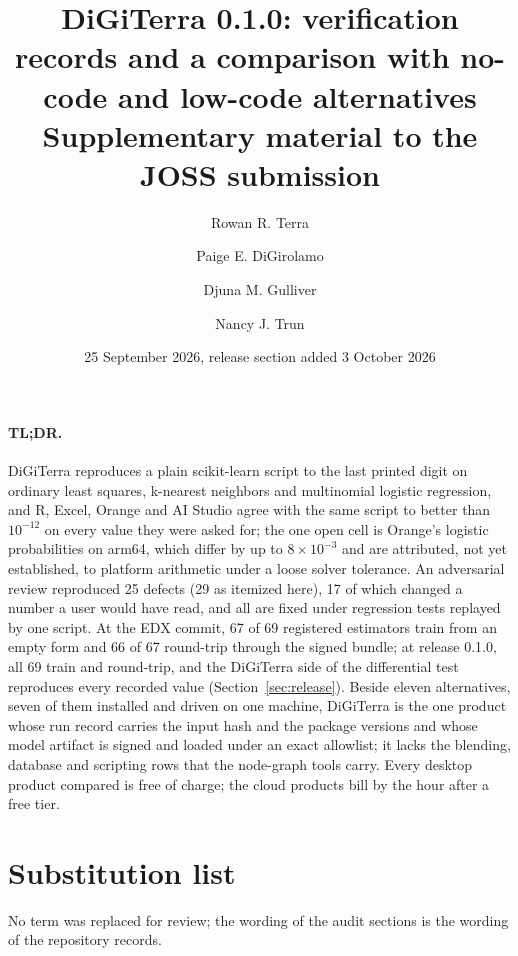 \newcommand{\DocFooter}{DiGiTerra 0.1.0, supplementary verification and comparison, 2026-10-03}

\title{DiGiTerra 0.1.0: verification records and a comparison with no-code and low-code alternatives\\[4pt]\large Supplementary material to the JOSS submission}
\author{Rowan R. Terra \and Paige E. DiGirolamo \and Djuna M. Gulliver \and Nancy J. Trun}
\date{25 September 2026, release section added 3 October 2026}

\maketitle

\paragraph{TL;DR.} DiGiTerra reproduces a plain scikit-learn script to the last printed digit on ordinary least squares, k-nearest neighbors and multinomial logistic regression, and R, Excel, Orange and AI Studio agree with the same script to better than $10^{-12}$ on every value they were asked for; the one open cell is Orange's logistic probabilities on arm64, which differ by up to $8\times10^{-3}$ and are attributed, not yet established, to platform arithmetic under a loose solver tolerance. An adversarial review reproduced 25 defects (29 as itemized here), 17 of which changed a number a user would have read, and all are fixed under regression tests replayed by one script. At the EDX commit, 67 of 69 registered estimators train from an empty form and 66 of 67 round-trip through the signed bundle; at release 0.1.0, all 69 train and round-trip, and the DiGiTerra side of the differential test reproduces every recorded value (Section~\ref{sec:release}). Beside eleven alternatives, seven of them installed and driven on one machine, DiGiTerra is the one product whose run record carries the input hash and the package versions and whose model artifact is signed and loaded under an exact allowlist; it lacks the blending, database and scripting rows that the node-graph tools carry. Every desktop product compared is free of charge; the cloud products bill by the hour after a free tier.

\tableofcontents












\section*{Substitution list}
No term was replaced for review; the wording of the audit sections is the wording of the repository records.


